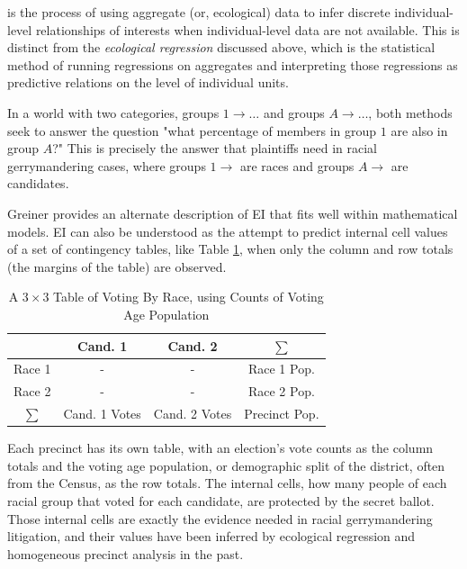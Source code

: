 
 is the process of using aggregate (or, ecological) data to infer discrete individual-level relationships of interests when individual-level data are not available.\cite{king1999} This is distinct from the \textit{ecological regression} discussed above, which is the statistical method of running regressions on aggregates and interpreting those regressions as predictive relations on the level of individual units.\cite{ec_reg}

In a world with two categories, groups $1 \rightarrow \dots$ and groups $A \rightarrow \dots$, both methods seek to answer the question "what percentage of members in group $1$ are also in group $A$?" This is precisely the answer that plaintiffs need in racial gerrymandering cases, where groups $1 \rightarrow$ are races and groups $A \rightarrow$ are candidates.

Greiner provides an alternate description of EI that fits well within mathematical models.\cite{greiner} EI can also be understood as the attempt to predict internal cell values of a set of contingency tables, like Table \ref{table:ei_example}, when only the column and row totals (the margins of the table) are observed.

\begin{table}
 \centering
 \caption{A $3 \times 3$ Table of Voting By Race, using Counts of Voting Age Population}
 \label{table:ei_example}
 \begin{tabular}{cccc}\toprule
         & Cand. 1       & Cand. 2       & $\sum$        \\\midrule
  Race 1 &      -         &       -        & Race 1 Pop.   \\
  Race 2 &     -          &      -         & Race 2 Pop.   \\
  $\sum$ & Cand. 1 Votes & Cand. 2 Votes & Precinct Pop.
 \end{tabular}
\end{table}

Each precinct has its own table, with an election's vote counts as the column totals and the voting age population, or demographic split of the district, often from the Census, as the row totals. The internal cells, how many people of each racial group that voted for each candidate, are protected by the secret ballot. Those internal cells are exactly the evidence needed in racial gerrymandering litigation, and their values have been inferred by ecological regression and homogeneous precinct analysis in the past.

